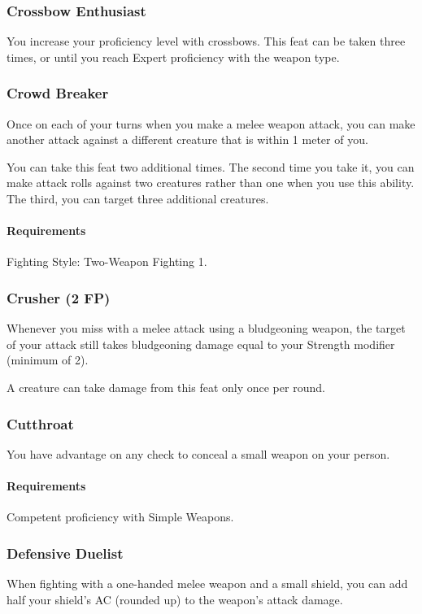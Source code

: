 \subsubsection{Crossbow Enthusiast} \label{feat::crossbowenthusiast}
    You increase your proficiency level with crossbows.
    This feat can be taken three times, or until you reach Expert proficiency with the weapon type.
\subsubsection{Crowd Breaker} \label{feat::crowdbreaker}
    Once on each of your turns when you make a melee weapon attack, you can make another attack against a different creature that is within 1 meter of you.

    You can take this feat two additional times.
    The second time you take it, you can make attack rolls against two creatures rather than one when you use this ability.
    The third, you can target three additional creatures.
    \paragraph{Requirements} Fighting Style: Two-Weapon Fighting 1.
\subsubsection{Crusher (2 FP)} \label{feat::crusher}
    Whenever you miss with a melee attack using a bludgeoning weapon, the target of your attack still takes bludgeoning damage equal to your Strength modifier (minimum of 2).

    A creature can take damage from this feat only once per round.
\subsubsection{Cutthroat} \label{feat::cutthroat}
    You have advantage on any check to conceal a small weapon on your person.
    \paragraph{Requirements} Competent proficiency with Simple Weapons.
\subsubsection{Defensive Duelist} \label{feat::defensiveduelist}
    When fighting with a one-handed melee weapon and a small shield, you can add half your shield's AC (rounded up) to the weapon's attack damage.
